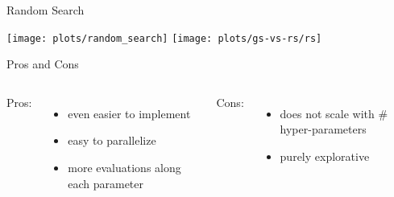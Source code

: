 \begin{frame}[c,fragile]{Random Search }

\begin{center}
\texttt{[image: plots/random\_search]}%
\texttt{[image: plots/gs-vs-rs/rs]}
\end{center}

\begin{block}{Pros and Cons}

\pause

\begin{columns}
Pros:
\begin{itemize}
  \item even easier to implement
  \item easy to parallelize 
  \item more evaluations along each parameter
\end{itemize}

Cons:
\begin{itemize}
  \item does not scale with $\#$hyper-parameters
  \item purely explorative
\end{itemize}


\end{columns}

\end{block}

\end{frame}

